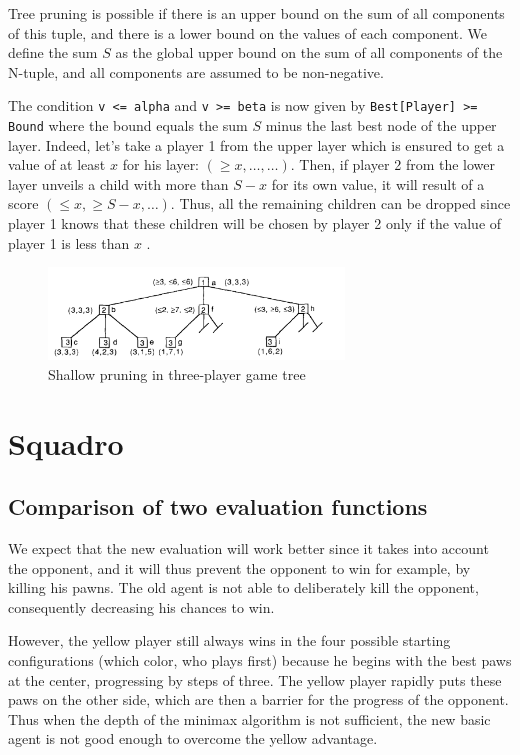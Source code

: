\documentclass[en]{article}
\newcommand{\py}[1]{\texttt{#1}}
\begin{document}
Tree pruning is possible if there is an upper bound on the sum of all components of this tuple, and there is a lower bound on the values of each component. We define the sum $S$ as the global upper bound on the sum of all components of the N-tuple, and all components are
assumed to be non-negative. 

The condition \py{v <= alpha} and \py{v >= beta} is now given by \py{Best[Player] >= Bound} where the bound equals the sum $S$ minus the last best node of the upper layer. Indeed, let's take a player 1 from the upper layer which is ensured to get a value of at least $x$ for his layer: $(\ge x, \dots, \dots)$. Then, if player 2 from the lower layer unveils a child with more than $S - x$ for its own value, it will result of a score $(\le x, \ge S - x, \dots)$. Thus, all the remaining children can be dropped since player 1 knows that these children will be chosen by player 2 only if the value of player 1 is less than $x$ \cite{multiplayer}.

\begin{figure}[H]
 \centering
 \includegraphics[width=0.7\textwidth]{multiplayer.png}
 \caption{Shallow pruning in three-player game tree \cite{multiplayer}}
 \label{fig:multiplayer}
\end{figure}


\section{Squadro}

\subsection{Comparison of two evaluation functions}

We expect that the new evaluation will work better since it takes into account the opponent, and it will thus prevent the opponent to win for example, by killing his pawns. The old agent is not able to deliberately kill the opponent, consequently decreasing his chances to win.

However, the yellow player still always wins in the four possible starting configurations (which color, who plays first) because he begins with the best paws at the center, progressing by steps of three. The yellow player rapidly puts these paws on the other side, which are then a barrier for the progress of the opponent.
Thus when the depth of the minimax algorithm is not sufficient, the new basic agent is not good enough to overcome the yellow advantage.
\end{document}
